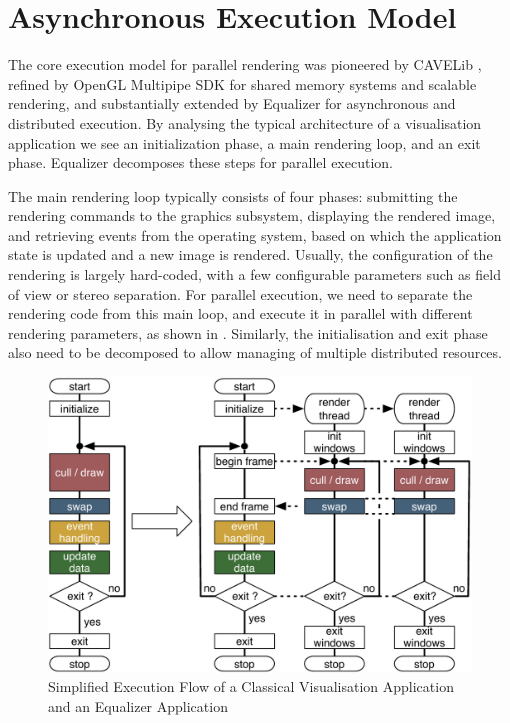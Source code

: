 \section{Asynchronous Execution Model}\label{sAsyncExec}

The core execution model for parallel rendering was pioneered by CAVELib
\cite{DACNCCGHPSNS:97}, refined by OpenGL Multipipe SDK for shared memory
systems and scalable rendering, and substantially extended by Equalizer for
asynchronous and distributed execution. By analysing the typical architecture of
a visualisation application we see an initialization phase, a main rendering
loop, and an exit phase. Equalizer decomposes these steps for parallel
execution.

The main rendering loop typically consists of four phases: submitting the
rendering commands to the graphics subsystem, displaying the rendered image,
and retrieving events from the operating system, based on which the application
state is updated and a new image is rendered. Usually, the configuration of
the rendering is largely hard-coded, with a few configurable parameters such as field of
view or stereo separation. For parallel execution, we need to separate the
rendering code from this main loop, and execute it in parallel with different
rendering parameters, as shown in . Similarly, the
initialisation and exit phase also need to be decomposed to allow managing of
multiple distributed resources.

\begin{figure}[ht]\center
 \includegraphics[width=.9\columnwidth]{images/executionFlow}
 \caption{Simplified Execution Flow of a Classical Visualisation Application
  and an Equalizer Application}
 \label{FIG_execution}
\end{figure}

